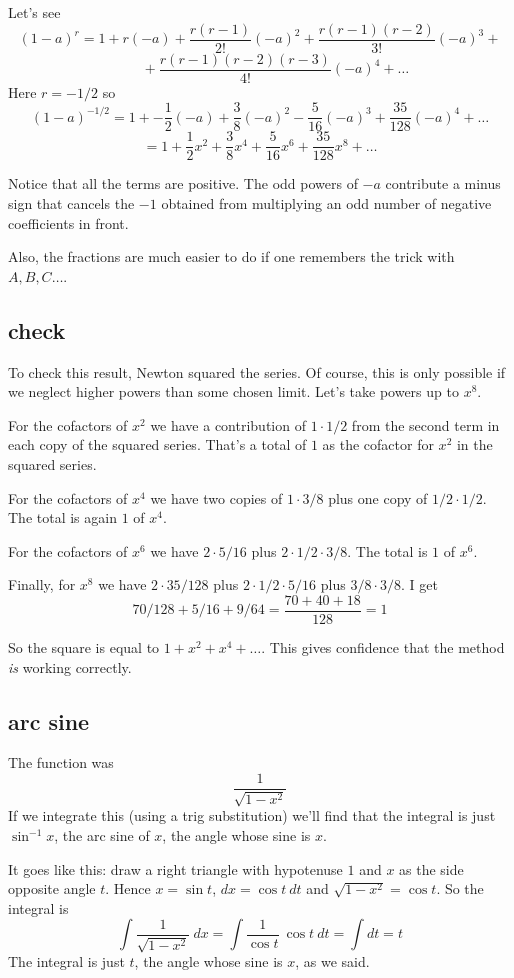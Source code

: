 \documentclass[11pt, oneside]{article}
\begin{document}
Let's see
\[ (1 - a)^{r} = 1 + r(-a) + \frac{r(r-1)}{2!} (-a)^2 + \frac{r(r-1)(r-2)}{3!} (-a)^3 + \]
\[ \ \ \ \ \ \ \ \ \ \ + \frac{r(r-1)(r-2)(r-3)}{4!} (-a)^4 + \dots \]
Here $r = -1/2$ so
\[ (1 - a)^{-1/2} = 1 + -\frac{1}{2}(-a) + \frac{3}{8} (-a)^2 - \frac{5}{16} (-a)^3 + \frac{35}{128} (-a)^4 + \dots \]
\[ = 1 + \frac{1}{2}x^2 + \frac{3}{8} x^4 + \frac{5}{16} x^6 + \frac{35}{128} x^8 + \dots \]

Notice that all the terms are positive.  The odd powers of $-a$ contribute a minus sign that cancels the $-1$ obtained from multiplying an odd number of negative coefficients in front.  

Also, the fractions are much easier to do if one remembers the trick with $A,B,C \dots$.

\subsection*{check}
To check this result, Newton squared the series.  Of course, this is only possible if we neglect higher powers than some chosen limit.  Let's take powers up to $x^8$.

For the cofactors of $x^2$ we have a contribution of $1 \cdot 1/2$ from the second term in each copy of the squared series.  That's a total of $1$ as the cofactor for $x^2$ in the squared series.

For the cofactors of $x^4$ we have two copies of $1 \cdot 3/8$ plus one copy of $1/2 \cdot 1/2$.  The total is again $1$ of $x^4$.

For the cofactors of $x^6$ we have $2 \cdot 5/16$ plus $2 \cdot 1/2 \cdot 3/8$.  The total is $1$ of $x^6$.

Finally, for $x^8$ we have $2 \cdot 35/128$ plus $2 \cdot 1/2 \cdot 5/16$ plus $3/8 \cdot 3/8$.  I get
\[ 70/128 + 5/16 + 9/64 = \frac{70 + 40 + 18}{128} = 1 \]

So the square is equal to $1 + x^2 + x^4 + \dots$.  This gives confidence that the method \emph{is} working correctly.

\subsection*{arc sine}
The function was
\[ \frac{1}{\sqrt{1 - x^2}} \]
If we integrate this (using a trig substitution) we'll find that the integral is just $\sin^{-1}x$, the arc sine of $x$, the angle whose sine is $x$.

It goes like this:  draw a right triangle with hypotenuse $1$ and $x$ as the side opposite angle $t$.  Hence $x = \sin t$, $dx = \cos t \ dt$ and $\sqrt{1-x^2} = \cos t$. So the integral is
\[ \int \frac{1}{\sqrt{1 - x^2}} \ dx = \int \frac{1}{\cos t} \ \cos t \ dt = \int dt = t \]
The integral is just $t$, the angle whose sine is $x$, as we said.
\end{document}
